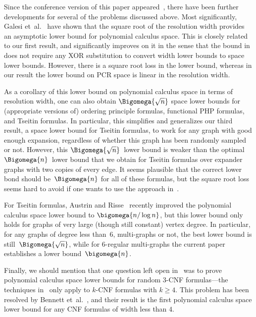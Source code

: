 \documentclass[11pt]{article}
\numberwithin{equation}{section}
\theoremstyle{definition}
\theoremstyle{plain}
\providecommand{\etal}{et~al.}
\begin{document}

Since the conference version of this paper 
appeared~\cite{conf-version}, %
there have been further developments for several of the problems
discussed above. 
%
Most significantly,
Galesi \etal~\cite{GKT19SpaceWidth} have shown that
the square root of the resolution width provides an asymptotic lower
bound for polynomial calculus space.
This is closely related to our first result, and significantly
improves on it in the sense that the bound in~\cite{GKT19SpaceWidth}
does not require any XOR substitution to convert width lower bounds to
space lower bounds. However, there is a square root loss in the lower
bound, whereas in our result the lower bound on PCR space is linear in
the resolution width.

As a corollary of this lower bound on polynomial calculus space in
terms of resolution width, one can also obtain
$\Bigomega{\sqrt{n}}$
space lower bounds for (appropriate versions of)
ordering principle formulas, 
functional PHP formulas, 
and
Tseitin formulas.
%
In particular, this simplifies and generalizes our third result, a
space lower bound for Tseitin formulas, to work for any graph with
good enough expansion, regardless of whether this graph has been
randomly sampled or not.
%
However, this
$\Bigomega{\sqrt{n}}$~lower bound is weaker than the optimal 
$\Bigomega{n}$~lower bound that we obtain for Tseitin formulas over
expander graphs with two copies of every edge. It seems plausible that 
the correct lower bond should be~$\Bigomega{n}$
for all of these formulas, but the square root loss seems hard to
avoid if one wants to use the approach in~\cite{GKT19SpaceWidth}.

For Tseitin formulas, Austrin and Risse~\cite{AR22PerfectMatching}
recently improved the polynomial calculus space lower bound to
$\bigomega{n/\log n}$,
but this lower bound only holds for graphs of very large (though
still constant) vertex degree. In particular, for any graphs of degree less
than~$6$, multi-graphs or not, the best lower bound is 
still~$\Bigomega{\sqrt{n}}$,
while for $6$-regular multi-graphs the current paper establishes  a
lower bound~$\bigomega{n}$.

Finally, we should mention that one question left open
in~\cite{BG15Framework} was to prove polynomial calculus space lower
bounds for random \mbox{$3$-CNF} formulas---the techniques 
in~\cite{BG15Framework} only apply %
to  %
\mbox{$k$-CNF} formulas with 
$k \geq 4$. This problem has been resolved by
Bennett \etal~\cite{BBGHMW17SpaceProofCplx},
and their result is the first polynomial calculus space lower bound for
any CNF formulas of width less than $4$.
\end{document}
